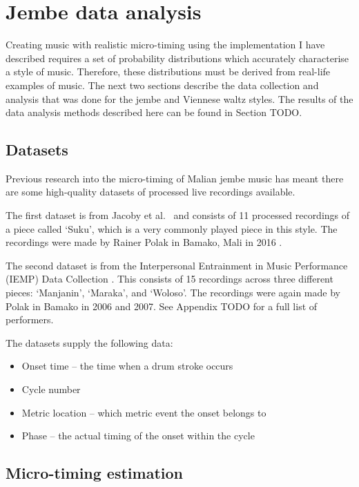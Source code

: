 \documentclass[12pt,twoside,openright]{report}
\begin{document}
\section{Jembe data analysis} \label{jembe_data_analysis}

Creating music with realistic micro-timing using the implementation I have
described requires a set of probability distributions which accurately
characterise a style of music. Therefore, these distributions must be derived
from real-life examples of music. The next two sections describe the data
collection and analysis that was done for the jembe and Viennese waltz styles.
The results of the data analysis methods described here can be found in
Section TODO.


\subsection{Datasets} \label{jembe_datasets}

Previous research into the micro-timing of Malian jembe music has meant there
are some high-quality datasets of processed live recordings available.

The first dataset is from Jacoby et al.\ \cite{jacoby2021} and consists of 11
processed recordings of a piece called `Suku', which is a very commonly played
piece in this style. The recordings were made by Rainer Polak in Bamako, Mali in
2016 \cite{jacoby2021supp}.

The second dataset is from the Interpersonal Entrainment in Music Performance
(IEMP) Data Collection \cite{polak2020,clayton2021}. This consists of 15 recordings
across three different pieces: `Manjanin', `Maraka', and `Woloso'. The
recordings were again made by Polak in Bamako in 2006 and 2007. See Appendix TODO for
a full list of performers.

The datasets supply the following data:
\begin{itemize}
	\item Onset time -- the time when a drum stroke occurs
	\item Cycle number
	\item Metric location -- which metric event the onset belongs to
	\item Phase -- the actual timing of the onset within the cycle
\end{itemize}


\subsection{Micro-timing estimation} \label{jembe_micro-timing}
\end{document}

